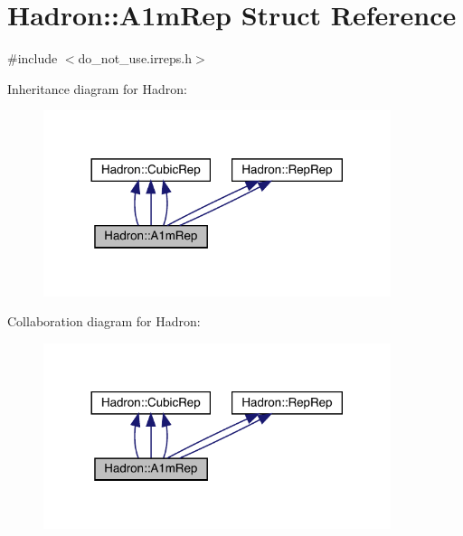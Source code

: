 \hypertarget{structHadron_1_1A1mRep}{}\section{Hadron\+:\+:A1m\+Rep Struct Reference}
\label{structHadron_1_1A1mRep}


{\ttfamily \#include $<$do\+\_\+not\+\_\+use.\+irreps.\+h$>$}



Inheritance diagram for Hadron\+:
\nopagebreak
\begin{figure}[H]
\begin{center}
\leavevmode
\includegraphics[width=288pt]{d3/da5/structHadron_1_1A1mRep__inherit__graph}
\end{center}
\end{figure}


Collaboration diagram for Hadron\+:
\nopagebreak
\begin{figure}[H]
\begin{center}
\leavevmode
\includegraphics[width=288pt]{db/d4a/structHadron_1_1A1mRep__coll__graph}
\end{center}
\end{figure}
